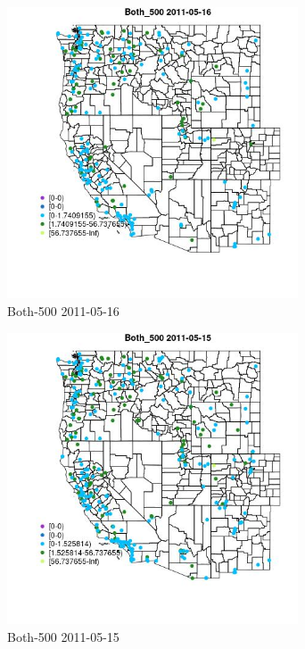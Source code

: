 \begin{figure} 
\centering  
\includegraphics[width=0.77\textwidth]{Code_Outputs/ML_input_report_ML_input_PM25_Step5_part_d_de_duplicated_aves_ML_input_MapObsBoth_5002011-05-16.jpg} 
\caption{\label{fig:ML_input_report_ML_input_PM25_Step5_part_d_de_duplicated_aves_ML_inputMapObsBoth_5002011-05-16}Both-500 2011-05-16} 
\end{figure} 
 

\begin{figure} 
\centering  
\includegraphics[width=0.77\textwidth]{Code_Outputs/ML_input_report_ML_input_PM25_Step5_part_d_de_duplicated_aves_ML_input_MapObsBoth_5002011-05-15.jpg} 
\caption{\label{fig:ML_input_report_ML_input_PM25_Step5_part_d_de_duplicated_aves_ML_inputMapObsBoth_5002011-05-15}Both-500 2011-05-15} 
\end{figure} 
 

